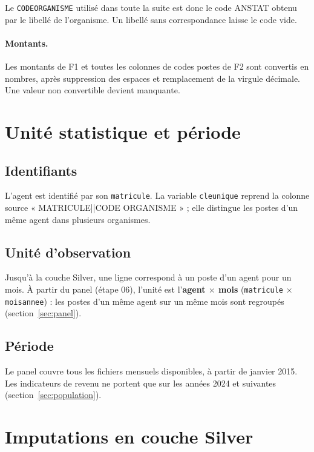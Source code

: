 \documentclass[12pt,a4paper,french]{article}
\renewcommand{\_}{\underscoreorigine\allowbreak}
\begin{document}
Le \texttt{CODE\_ORGANISME} utilisé dans toute la suite est donc le code ANSTAT obtenu par le libellé de l'organisme. Un libellé sans correspondance laisse le code vide.

\paragraph{Montants.} Les montants de F1 et toutes les colonnes de codes postes de F2 sont convertis en nombres, après suppression des espaces et remplacement de la virgule décimale. Une valeur non convertible devient manquante.

\section{Unité statistique et période}

\subsection{Identifiants}

L'agent est identifié par son \texttt{matricule}. La variable \texttt{cle\_unique} reprend la colonne source « MATRICULE||CODE ORGANISME » ; elle distingue les postes d'un même agent dans plusieurs organismes.

\subsection{Unité d'observation}

Jusqu'à la couche Silver, une ligne correspond à un poste d'un agent pour un mois. À partir du panel (étape 06), l'unité est l'\textbf{agent $\times$ mois} (\texttt{matricule} $\times$ \texttt{mois\_annee}) : les postes d'un même agent sur un même mois sont regroupés (section~\ref{sec:panel}).

\subsection{Période}

Le panel couvre tous les fichiers mensuels disponibles, à partir de janvier 2015. Les indicateurs de revenu ne portent que sur les années 2024 et suivantes (section~\ref{sec:population}).

\section{Imputations en couche Silver}
\end{document}
